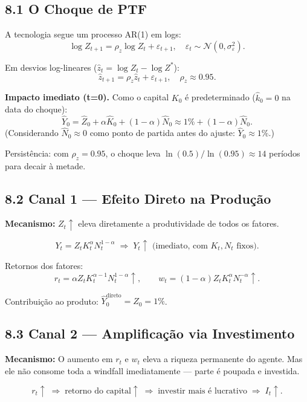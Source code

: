 \documentclass[12pt, a4paper]{article}
\begin{document}
\subsection*{8.1 O Choque de PTF}

A tecnologia segue um processo AR(1) em logs:
\[
\log Z_{t+1} = \rho_z\log Z_t + \varepsilon_{t+1}, \quad \varepsilon_t \sim \mathcal{N}(0,\sigma_\varepsilon^2).
\]

Em desvios log-lineares ($\hat{z}_t = \log Z_t - \log Z^*$):
\[
\hat{z}_{t+1} = \rho_z\hat{z}_t + \varepsilon_{t+1}, \quad \rho_z \approx 0.95.
\]

\textbf{Impacto imediato (t=0).} Como o capital $K_0$ é predeterminado ($\hat{k}_0 = 0$ na data do choque):
\[
\hat{Y}_0 = \hat{Z}_0 + \alpha\hat{K}_0 + (1-\alpha)\hat{N}_0 \approx 1\% + (1-\alpha)\hat{N}_0.
\]
(Considerando $\hat{N}_0 \approx 0$ como ponto de partida antes do ajuste: $\hat{Y}_0 \approx 1\%$.)

Persistência: com $\rho_z = 0.95$, o choque leva $\ln(0.5)/\ln(0.95) \approx 14$ períodos para decair à metade.

\subsection*{8.2 Canal 1 --- Efeito Direto na Produção}

\textbf{Mecanismo:} $Z_t\uparrow$ eleva diretamente a produtividade de todos os fatores.

\[
Y_t = Z_t K_t^\alpha N_t^{1-\alpha} \;\Longrightarrow\; Y_t\uparrow \text{ (imediato, com }K_t,N_t\text{ fixos).}
\]

Retornos dos fatores:
\[
r_t = \alpha Z_t K_t^{\alpha-1}N_t^{1-\alpha}\uparrow, \qquad w_t = (1-\alpha)Z_t K_t^\alpha N_t^{-\alpha}\uparrow.
\]

Contribuição ao produto: $\hat{Y}_0^{\text{direto}} = \hat{Z}_0 = 1\%$.

\subsection*{8.3 Canal 2 --- Amplificação via Investimento}

\textbf{Mecanismo:} O aumento em $r_t$ e $w_t$ eleva a riqueza permanente do agente. Mas ele não consome toda a windfall imediatamente --- parte é poupada e investida.

\[
r_t\uparrow \;\Rightarrow\; \text{retorno do capital}\uparrow \;\Rightarrow\; \text{investir mais é lucrativo} \;\Rightarrow\; I_t\uparrow.
\]
\end{document}
